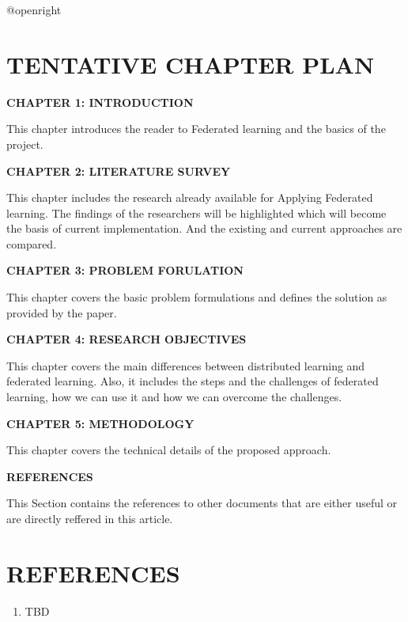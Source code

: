 \documentclass[14pt]{extarticle}
\makeatletter
\newcommand\backmatter{
    \if @openright
        \cleardoublepage
    \else
        \clearpage
    \fi
}
\makeatother
\begin{document}
\backmatter

\newpage
{}
\section*{TENTATIVE CHAPTER PLAN}

\textbf{CHAPTER 1: INTRODUCTION }

\par This chapter introduces the reader to Federated learning and the basics of the project.

\textbf{CHAPTER 2: LITERATURE SURVEY}

\par This chapter includes the research already available for Applying Federated learning. The findings of the researchers will be highlighted which will become the basis of current implementation. And the existing and current approaches are compared.

\textbf{CHAPTER 3: PROBLEM FORULATION}

\par This chapter covers the basic problem formulations and defines the solution as provided by the paper.

\textbf{CHAPTER 4: RESEARCH OBJECTIVES}

\par This chapter covers the main differences between distributed learning and federated learning. Also, it includes the steps and the challenges of federated learning, how we can use it and how we can overcome the challenges.

\textbf{CHAPTER 5: METHODOLOGY}

\par This chapter covers the technical details of the proposed approach.

\textbf{REFERENCES}

\par This Section contains the references to other documents that are either useful or are directly reffered in this article.


\newpage
{}
\section*{REFERENCES}
\begin{enumerate}
    \item TBD
\end{enumerate}
\end{document}
